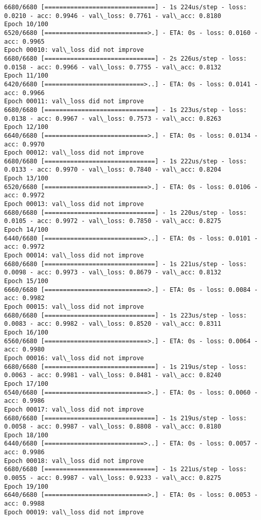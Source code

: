 \documentclass[11pt]{article}
\begin{document}
\begin{Verbatim}[commandchars=\\\{\}]
6680/6680 [==============================] - 1s 224us/step - loss: 0.0210 - acc: 0.9946 - val\_loss: 0.7761 - val\_acc: 0.8180
Epoch 10/100
6520/6680 [============================>.] - ETA: 0s - loss: 0.0160 - acc: 0.9965
Epoch 00010: val\_loss did not improve
6680/6680 [==============================] - 2s 226us/step - loss: 0.0158 - acc: 0.9966 - val\_loss: 0.7755 - val\_acc: 0.8132
Epoch 11/100
6420/6680 [===========================>..] - ETA: 0s - loss: 0.0141 - acc: 0.9966
Epoch 00011: val\_loss did not improve
6680/6680 [==============================] - 1s 223us/step - loss: 0.0138 - acc: 0.9967 - val\_loss: 0.7573 - val\_acc: 0.8263
Epoch 12/100
6640/6680 [============================>.] - ETA: 0s - loss: 0.0134 - acc: 0.9970
Epoch 00012: val\_loss did not improve
6680/6680 [==============================] - 1s 222us/step - loss: 0.0133 - acc: 0.9970 - val\_loss: 0.7840 - val\_acc: 0.8204
Epoch 13/100
6520/6680 [============================>.] - ETA: 0s - loss: 0.0106 - acc: 0.9972
Epoch 00013: val\_loss did not improve
6680/6680 [==============================] - 1s 220us/step - loss: 0.0105 - acc: 0.9972 - val\_loss: 0.7850 - val\_acc: 0.8275
Epoch 14/100
6440/6680 [===========================>..] - ETA: 0s - loss: 0.0101 - acc: 0.9972
Epoch 00014: val\_loss did not improve
6680/6680 [==============================] - 1s 221us/step - loss: 0.0098 - acc: 0.9973 - val\_loss: 0.8679 - val\_acc: 0.8132
Epoch 15/100
6660/6680 [============================>.] - ETA: 0s - loss: 0.0084 - acc: 0.9982
Epoch 00015: val\_loss did not improve
6680/6680 [==============================] - 1s 223us/step - loss: 0.0083 - acc: 0.9982 - val\_loss: 0.8520 - val\_acc: 0.8311
Epoch 16/100
6560/6680 [============================>.] - ETA: 0s - loss: 0.0064 - acc: 0.9980
Epoch 00016: val\_loss did not improve
6680/6680 [==============================] - 1s 219us/step - loss: 0.0063 - acc: 0.9981 - val\_loss: 0.8481 - val\_acc: 0.8240
Epoch 17/100
6540/6680 [============================>.] - ETA: 0s - loss: 0.0060 - acc: 0.9986
Epoch 00017: val\_loss did not improve
6680/6680 [==============================] - 1s 219us/step - loss: 0.0058 - acc: 0.9987 - val\_loss: 0.8808 - val\_acc: 0.8180
Epoch 18/100
6440/6680 [===========================>..] - ETA: 0s - loss: 0.0057 - acc: 0.9986
Epoch 00018: val\_loss did not improve
6680/6680 [==============================] - 1s 221us/step - loss: 0.0055 - acc: 0.9987 - val\_loss: 0.9233 - val\_acc: 0.8275
Epoch 19/100
6640/6680 [============================>.] - ETA: 0s - loss: 0.0053 - acc: 0.9988
Epoch 00019: val\_loss did not improve

\end{Verbatim}
\end{document}
